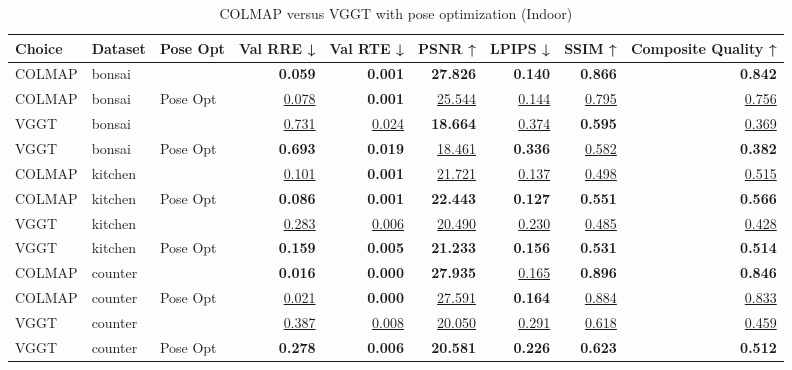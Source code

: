 \begin{table}[H]
\caption{\ifdefined\customcaption \customcaption \else COLMAP versus VGGT with pose optimization (Indoor) \fi}
\label{tab:04_pose_opt_indoor}
\centering
\scriptsize
\begin{tabular}{lllrrrrrr}
\toprule
Choice & Dataset & Pose Opt & Val RRE ↓ & Val RTE ↓ & PSNR ↑ & LPIPS ↓ & SSIM ↑ & Composite Quality ↑ \\
\midrule
COLMAP & bonsai &  & \textbf{0.059} & \textbf{0.001} & \textbf{27.826} & \textbf{0.140} & \textbf{0.866} & \textbf{0.842} \\
COLMAP & bonsai & Pose Opt & \underline{0.078} & \textbf{0.001} & \underline{25.544} & \underline{0.144} & \underline{0.795} & \underline{0.756} \\
\midrule
VGGT & bonsai &  & \underline{0.731} & \underline{0.024} & \textbf{18.664} & \underline{0.374} & \textbf{0.595} & \underline{0.369} \\
VGGT & bonsai & Pose Opt & \textbf{0.693} & \textbf{0.019} & \underline{18.461} & \textbf{0.336} & \underline{0.582} & \textbf{0.382} \\
\midrule
COLMAP & kitchen &  & \underline{0.101} & \textbf{0.001} & \underline{21.721} & \underline{0.137} & \underline{0.498} & \underline{0.515} \\
COLMAP & kitchen & Pose Opt & \textbf{0.086} & \textbf{0.001} & \textbf{22.443} & \textbf{0.127} & \textbf{0.551} & \textbf{0.566} \\
\midrule
VGGT & kitchen &  & \underline{0.283} & \underline{0.006} & \underline{20.490} & \underline{0.230} & \underline{0.485} & \underline{0.428} \\
VGGT & kitchen & Pose Opt & \textbf{0.159} & \textbf{0.005} & \textbf{21.233} & \textbf{0.156} & \textbf{0.531} & \textbf{0.514} \\
\midrule
COLMAP & counter &  & \textbf{0.016} & \textbf{0.000} & \textbf{27.935} & \underline{0.165} & \textbf{0.896} & \textbf{0.846} \\
COLMAP & counter & Pose Opt & \underline{0.021} & \textbf{0.000} & \underline{27.591} & \textbf{0.164} & \underline{0.884} & \underline{0.833} \\
\midrule
VGGT & counter &  & \underline{0.387} & \underline{0.008} & \underline{20.050} & \underline{0.291} & \underline{0.618} & \underline{0.459} \\
VGGT & counter & Pose Opt & \textbf{0.278} & \textbf{0.006} & \textbf{20.581} & \textbf{0.226} & \textbf{0.623} & \textbf{0.512} \\
\bottomrule
\end{tabular}
\end{table}